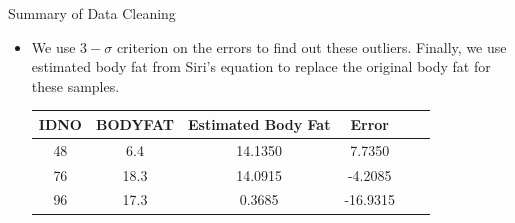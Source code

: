 \documentclass{ctexbeamer}        %
\begin{document}
\begin{frame}{Summary of Data Cleaning}

\begin{itemize}
\item We use $3-\sigma$ criterion on the errors to find out these outliers. Finally, we use estimated body fat from Siri's equation to replace the original body fat for these samples.
\newline

\begin{tabular}{cccccc}
   \toprule
   IDNO & BODYFAT & Estimated Body Fat & Error\\
   \midrule
   48 & 6.4 & 14.1350 & 7.7350 \\
   76 & 18.3 & 14.0915 & -4.2085 \\   
   96 & 17.3 & 0.3685 & -16.9315 \\
   \bottomrule
\end{tabular}
\end{itemize}

\end{frame}
\end{document}
